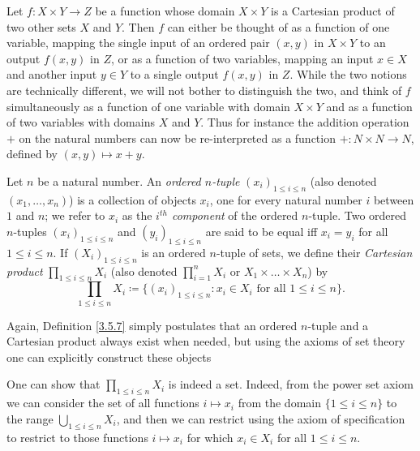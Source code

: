 \begin{note}
    Let \(f : X \times Y \to Z\) be a function whose domain \(X \times Y\) is a Cartesian product of two other sets \(X\) and \(Y\).
    Then \(f\) can either be thought of as a function of one variable, mapping the single input of an ordered pair \((x, y)\) in \(X \times Y\) to an output \(f(x, y)\) in \(Z\), or as a function of two variables, mapping an input \(x \in X\) and another input \(y \in Y\) to a single output \(f(x, y)\) in \(Z\).
    While the two notions are technically different, we will not bother to distinguish the two, and think of \(f\) simultaneously as a function of one variable with domain \(X \times Y\) and as a function of two variables with domains \(X\) and \(Y\).
    Thus for instance the addition operation \(+\) on the natural numbers can now be re-interpreted as a function \(+ : N \times N \to N\), defined by \((x, y) \mapsto x + y\).
\end{note}

\setcounter{theorem}{6}
\begin{definition}\label{3.5.7}
    Let \(n\) be a natural number.
    An \emph{ordered \(n\)-tuple} \((x_i)_{1 \leq i \leq n}\) (also denoted \((x_1, \dots, x_n)\)) is a collection of objects \(x_i\), one for every natural number \(i\) between \(1\) and \(n\);
    we refer to \(x_i\) as the \emph{\(i^{th}\) component} of the ordered \(n\)-tuple.
    Two ordered \(n\)-tuples \((x_i)_{1 \leq i \leq n}\) and \((y_i)_{1 \leq i \leq n}\) are said to be equal iff \(x_i = y_i\) for all \(1 \leq i \leq n\).
    If \((X_i)_{1 \leq i \leq n}\) is an ordered \(n\)-tuple of sets, we define their \emph{Cartesian product} \(\prod_{1 \leq i \leq n} X_i\) (also denoted \(\prod_{i=1}^n X_i\) or \(X_1 \times \dots \times X_n\)) by
    \[
        \prod_{1 \leq i \leq n} X_i \coloneqq \{(x_i)_{1 \leq i \leq n} : x_i \in X_i \text{ for all } 1 \leq i \leq n\}.
    \]
\end{definition}

\begin{note}
    Again, Definition \ref{3.5.7} simply postulates that an ordered \(n\)-tuple and a Cartesian product always exist when needed, but using the axioms of set theory one can explicitly construct these objects
\end{note}

\begin{remark}\label{3.5.8}
    One can show that \(\prod_{1 \leq i \leq n} X_i\) is indeed a set.
    Indeed, from the power set axiom we can consider the set of all functions \(i \mapsto x_i\) from the domain \(\{1 \leq i \leq n\}\) to the range \(\bigcup_{1 \leq i \leq n} X_i\), and then we can restrict using the axiom of specification to restrict to those functions \(i \mapsto x_i\) for which \(x_i \in X_i\) for all \(1 \leq i \leq n\).
\end{remark}

